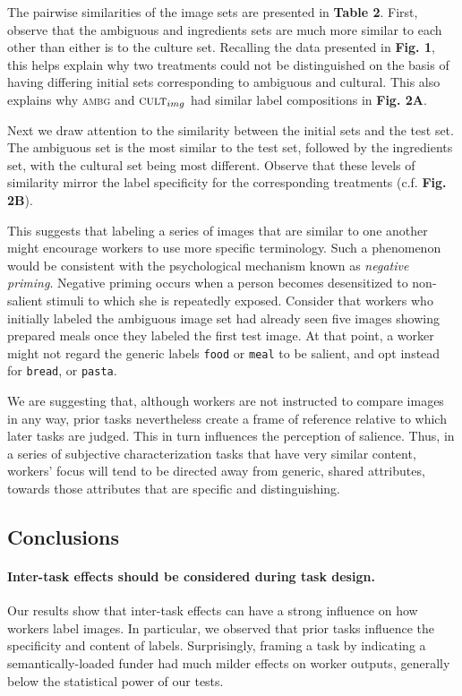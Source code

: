 \documentclass[letterpaper]{article}
\begin{document}
The pairwise similarities of the image sets are presented in \textbf{Table 2}. 
First, observe that the ambiguous and ingredients sets are much more similar 
to each other than either is to the culture set.  Recalling the data presented
in \textbf{Fig. 1}, this helps explain why two treatments could not be 
distinguished on the basis of having differing initial sets corresponding to
ambiguous and cultural.  This also explains why \textsc{ambg} and 
$\textsc{cult}_{img}$ had similar label compositions in \textbf{Fig. 2A}.

Next we draw attention to the similarity between the initial sets and the test 
set.  The ambiguous set is the most similar to the test set, followed by the
ingredients set, with the cultural set being most different.
Observe that these levels of similarity mirror the label specificity for the 
corresponding treatments (c.f. \textbf{Fig. 2B}).  

This suggests that labeling a series of images that are similar to 
one another might encourage workers to use more specific terminology.
Such a phenomenon would be consistent with the psychological mechanism known 
as \textit{negative priming}.  Negative priming occurs when a person becomes 
desensitized to non-salient stimuli to which she is repeatedly 
exposed.  Consider that workers who initially 
labeled the ambiguous image set had already seen five images showing 
prepared meals once they labeled the first test image.  At that point,
a worker might not regard the generic labels \texttt{food} or \texttt{meal} 
to be salient, and opt instead for \texttt{bread}, or \texttt{pasta}.

We are suggesting that, although workers are not instructed to compare
images in any way, prior tasks nevertheless create a frame of reference
relative to which later tasks are judged.  This in turn 
influences the perception of salience. Thus, in a series of subjective 
characterization tasks that have very similar content, workers' focus 
will tend to be directed away from generic, shared attributes, towards those 
attributes that are specific and distinguishing.
\subsection*{Conclusions}
\paragraph{Inter-task effects should be considered during task design.}  
Our results show that inter-task effects can have a strong influence on how
workers label images.  In particular, we observed that prior tasks influence
the specificity and content of labels.  Surprisingly, framing a task by 
indicating a semantically-loaded funder had much milder effects on worker 
outputs, generally below the statistical power of our tests.
\end{document}
